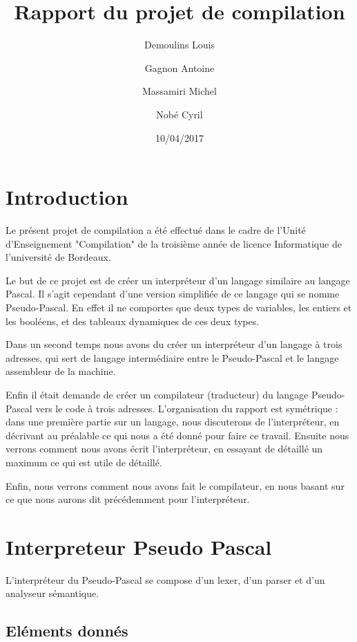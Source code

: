 \documentclass{article}
\title{Rapport du projet de compilation}
\date{10/04/2017}
\author{Demoulins Louis \and Gagnon Antoine \and Massamiri Michel \and Nobé Cyril}
\begin{document}
\maketitle
\newpage

\tableofcontents

\newpage
\section{Introduction}

Le présent projet de compilation a été effectué dans le cadre de l'Unité d'Enseignement "Compilation" de la troisième année de licence Informatique de l'université de Bordeaux.

\medbreak

Le but de ce projet est de créer un interpréteur d'un langage similaire au langage Pascal. Il s'agit cependant d'une version simplifiée de ce langage qui se nomme Pseudo-Pascal.
En effet il ne comportes que deux types de variables, les entiers et les booléens, et des tableaux dynamiques de ces deux types.

Dans un second temps nous avons du créer un interpréteur d'un langage à trois adresses, qui sert de langage intermédiaire entre le Pseudo-Pascal et le langage assembleur de la machine.

Enfin il était demande de créer un compilateur (traducteur) du langage Pseudo-Pascal vers le code à trois adresses.
\bigbreak
L'organisation du rapport est symétrique : dans une première partie sur un langage, nous discuterons de l'interpréteur, en décrivant au préalable ce qui nous a été donné pour faire ce travail.
Ensuite nous verrons comment nous avons écrit l'interpréteur, en essayant de détaillé un maximum ce qui est utile de détaillé.

Enfin, nous verrons comment nous avons fait le compilateur, en nous basant sur ce que nous aurons dit précédemment pour l'interpréteur.

\newpage
\section{Interpreteur Pseudo Pascal}

L'interpréteur du Pseudo-Pascal se compose d'un lexer, d'un parser et d'un analyseur sémantique.

\subsection{Eléments donnés}
\end{document}
